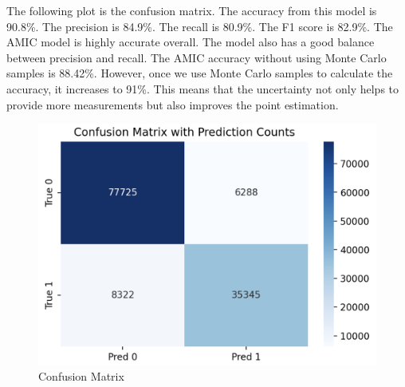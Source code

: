 \documentclass{article}
\begin{document}
The following plot is the confusion matrix. The accuracy from this model is 90.8\%. The precision is 84.9\%. The recall is 80.9\%. The F1 score is 82.9\%. The AMIC model is highly accurate overall. The model also has a good balance between precision and recall. The AMIC accuracy without using Monte Carlo samples is 88.42\%. However, once we use Monte Carlo samples to calculate the accuracy, it increases to 91\%. This means that the uncertainty not only helps to provide more measurements but also improves the point estimation. 
\begin{figure}
    \centering
    \includegraphics[width=0.5\linewidth]{confusion.png}
    \caption{Confusion Matrix}
    \label{fig:placeholder}
\end{figure}
\end{document}
